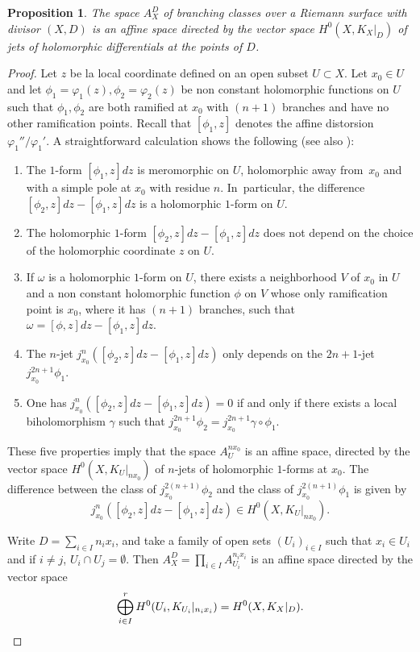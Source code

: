 \documentclass[10pt]{amsart}
\theoremstyle{definition}
\theoremstyle{plain}
\newtheorem{proposition}[definition]{Proposition}
\begin{document}
\begin{proposition}\label{proposition_affine_structure_branching_classes}
The space $A_X^D$ of branching classes over a Riemann surface with divisor $(X, D)$ is an affine space directed by the vector space $H^0\left(X, K_X|_D\right)$ of jets of holomorphic differentials at the points of $D$.
\end{proposition}

\begin{proof}
Let $z$ be la local coordinate defined on an open subset $U \subset X$.
Let $x_0 \in U$ and let $\phi_1 = \varphi_1(z), \phi_2 = \varphi_2(z)$ be non constant holomorphic functions on $U$ such that $\phi_1, \phi_2$ are both ramified at $x_0$ with $(n+1)$ branches and have no other ramification points.
Recall that $[\phi_1, z]$ denotes the affine distorsion $\varphi_1''/\varphi_1'$.
A straightforward calculation shows the following (see also \cite{gunning}):
\begin{enumerate}
\item
The $1$-form $[\phi_1, z]dz$ is meromorphic on $U$, holomorphic away from~$x_0$ and with a simple pole at $x_0$ with residue $n$. In~particular, the difference $[\phi_2, z]dz - [\phi_1, z]dz$ is a holomorphic $1$-form on $U$.
\item
The holomorphic $1$-form $[\phi_2, z]dz - [\phi_1, z]dz$ does not depend on the choice of the holomorphic coordinate $z$ on $U$.
\item
If $\omega$ is a holomorphic $1$-form on $U$, there exists a neighborhood $V$ of $x_0$ in $U$ and a non constant holomorphic function $\phi$ on $V$ whose only ramification point is $x_0$, where it has $(n+1)$ branches, such that $\omega = [\phi, z]dz - [\phi_1, z]dz$.
\item
The $n$-jet $j_{x_0}^n\left([\phi_2, z]dz - [\phi_1, z]dz\right)$ only depends on the $2n+1$-jet $j_{x_0}^{2n+1}\phi_1$.
\item
One has $j_{x_0}^n\left([\phi_2, z]dz - [\phi_1, z]dz\right) = 0$ if and only if there exists a local biholomorphism $\gamma$ such that $j_{x_0}^{2n+1}\phi_2 = j_{x_0}^{2n+1}\gamma \circ \phi_1$.
\end{enumerate}

These five properties imply that the space $A_U^{nx_0}$ is an affine space, directed by the vector space $H^0\left(X, K_U|_{nx_0}\right)$ of $n$-jets of holomorphic $1$-forms at $x_0$.
The difference between the class of $j_{x_0}^{2(n+1)} \phi_2$ and the class of $j_{x_0}^{2(n+1)} \phi_1$ is given by
\[
j_{x_0}^n([\phi_2, z]dz - [\phi_1, z]dz) \in H^0(X, K_U|_{nx_0}).
\]

Write $D = \sum_{i \in I} n_i x_i$, and take a family of open sets $(U_i)_{i \in I}$ such that $x_i \in U_i$ and if $i \neq j$, $U_i \cap U_j = \emptyset$.
Then $A_X^D = \prod_{i \in I} A_{U_i}^{n_ix_i}$ is an affine space directed by the vector space
\[
\bigoplus_{i \in I}^r H^0(U_i, K_{U_i}|_{n_ix_i}) = H^0(X, K_X|_D).\qedhere
\]
\end{proof}
\end{document}
